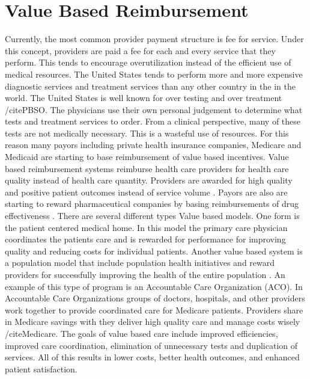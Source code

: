 \documentclass[sigconf]{acmart}
\begin{document}
\section{Value Based Reimbursement}
Currently, the most common provider payment structure is fee for service. Under this concept, providers are paid a fee for each and every service that they perform. This tends to encourage overutilization instead of the efficient use of medical resources. The United States tends to perform more and more expensive diagnostic services and treatment services than any other country in the in the world. The United States is well known for over testing and over treatment /cite{PBSO}. The physicians use their own personal judgement to determine what tests and treatment services to order.  From a clinical perspective, many of these tests are not medically necessary. This is a wasteful use of resources. 
For this reason many payors including private health insurance companies, Medicare and Medicaid are starting to base reimbursement of value based incentives.  Value based reimbursement systems reimburse health care providers for health care quality instead of health care quantity. Providers are awarded for high quality and positive patient outcomes instead of service volume \cite{McDonald}.  Payors are also are starting to reward pharmaceutical companies by basing reimbursements of drug effectiveness \cite{McKinsey}. 
There are several different types Value based models. One form is the patient centered medical home. In this model the primary care physician coordinates the patients care and is rewarded for performance for improving quality and reducing costs for individual patients. Another value based system is a population model that include population health initiatives and reward providers for successfully improving the health of the entire population \cite{value}. An example of this type of program is an Accountable Care Organization (ACO). In Accountable Care Organizations groups of doctors, hospitals, and other providers work together to provide coordinated care for Medicare patients. Providers share in Medicare savings with they deliver high quality care and manage costs wisely /cite{Medicare}.
The goals of value based care include improved efficiencies, improved care coordination, elimination of  unnecessary tests and duplication of services.  All of this results in lower costs, better health outcomes, and enhanced patient satisfaction. 
\end{document}
